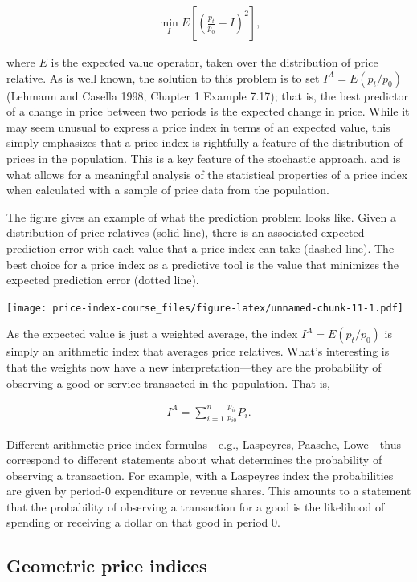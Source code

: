 \documentclass[]{article}
\begin{document}
\begin{align*}
\min_{I} E\left[\left(\frac{p_{t}}{p_{0}} - I \right)^{2}\right],
\end{align*}

where \(E\) is the expected value operator, taken over the distribution of price relative. As is well known, the solution to this problem is to set \(I^{A} = E(p_{t} / p_{0})\) (Lehmann and Casella 1998, Chapter 1 Example 7.17); that is, the best predictor of a change in price between two periods is the expected change in price. While it may seem unusual to express a price index in terms of an expected value, this simply emphasizes that a price index is rightfully a feature of the distribution of prices in the population. This is a key feature of the stochastic approach, and is what allows for a meaningful analysis of the statistical properties of a price index when calculated with a sample of price data from the population.

The figure gives an example of what the prediction problem looks like. Given a distribution of price relatives (solid line), there is an associated expected prediction error with each value that a price index can take (dashed line). The best choice for a price index as a predictive tool is the value that minimizes the expected prediction error (dotted line).

\texttt{[image: price-index-course\_files/figure-latex/unnamed-chunk-11-1.pdf]}

As the expected value is just a weighted average, the index \(I^{A} = E(p_{t} / p_{0})\) is simply an arithmetic index that averages price relatives. What's interesting is that the weights now have a new interpretation---they are the probability of observing a good or service transacted in the population. That is,

\begin{align*}
I^{A} = \sum_{i = 1}^{n} \frac{p_{it}}{p_{i0}} P_{i}.
\end{align*}

Different arithmetic price-index formulas---e.g., Laspeyres, Paasche, Lowe---thus correspond to different statements about what determines the probability of observing a transaction. For example, with a Laspeyres index the probabilities are given by period-0 expenditure or revenue shares. This amounts to a statement that the probability of observing a transaction for a good is the likelihood of spending or receiving a dollar on that good in period 0.

\hypertarget{geometric-price-indices-1}{%
\subsection{Geometric price indices}\label{geometric-price-indices-1}}
\end{document}
